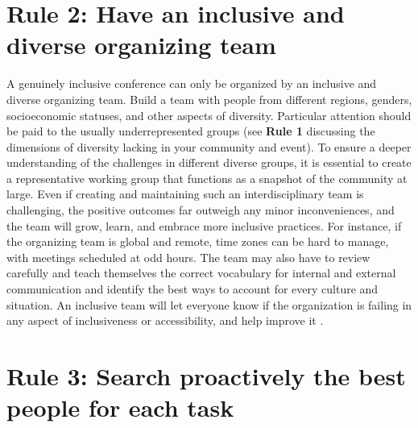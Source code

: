 \documentclass[10pt,letterpaper]{article}
\begin{document}
\section*{Rule 2: Have an inclusive and diverse organizing team}
A genuinely inclusive conference can only be organized by an inclusive and diverse organizing team. Build a team with people from different regions, genders, socioeconomic statuses, and other aspects of diversity. Particular attention should be paid to the usually underrepresented groups (see \textbf{Rule 1} discussing the dimensions of diversity lacking in your community and event). To ensure a deeper understanding of the challenges in different diverse groups, it is essential to create a representative working group that functions as a snapshot of the community at large. Even if creating and maintaining such an interdisciplinary team is challenging, the positive outcomes far outweigh any minor inconveniences, and the team will grow, learn, and embrace more inclusive practices. For instance, if the organizing team is global and remote, time zones can be hard to manage, with meetings scheduled at odd hours. The team may also have to review carefully and teach themselves the correct vocabulary for internal and external communication and identify the best ways to account for every culture and situation. 
An inclusive team will let everyone know if the organization is failing in any aspect of inclusiveness or accessibility, and help improve it \cite{hong_groups_2004}.


\section*{Rule 3: Search proactively the best people for each task}
\end{document}
